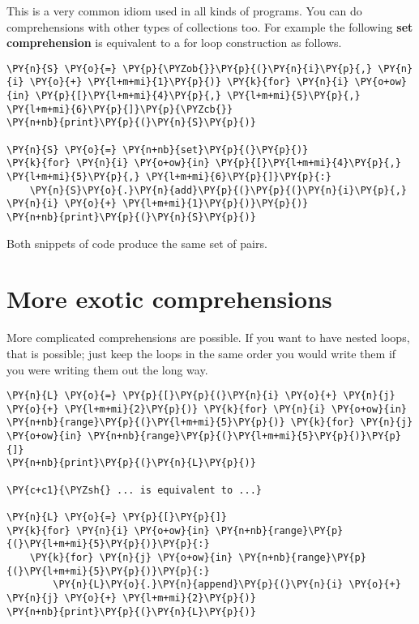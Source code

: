 This is a very common idiom used in all kinds of programs.  You can do comprehensions with other types of collections too.  For example the following \textbf{set comprehension} is equivalent to a for loop construction as follows.

\begin{Verbatim}[commandchars=\\\{\}]
\PY{n}{S} \PY{o}{=} \PY{p}{\PYZob{}}\PY{p}{(}\PY{n}{i}\PY{p}{,} \PY{n}{i} \PY{o}{+} \PY{l+m+mi}{1}\PY{p}{)} \PY{k}{for} \PY{n}{i} \PY{o+ow}{in} \PY{p}{[}\PY{l+m+mi}{4}\PY{p}{,} \PY{l+m+mi}{5}\PY{p}{,} \PY{l+m+mi}{6}\PY{p}{]}\PY{p}{\PYZcb{}}
\PY{n+nb}{print}\PY{p}{(}\PY{n}{S}\PY{p}{)}

\PY{n}{S} \PY{o}{=} \PY{n+nb}{set}\PY{p}{(}\PY{p}{)}
\PY{k}{for} \PY{n}{i} \PY{o+ow}{in} \PY{p}{[}\PY{l+m+mi}{4}\PY{p}{,} \PY{l+m+mi}{5}\PY{p}{,} \PY{l+m+mi}{6}\PY{p}{]}\PY{p}{:}
    \PY{n}{S}\PY{o}{.}\PY{n}{add}\PY{p}{(}\PY{p}{(}\PY{n}{i}\PY{p}{,} \PY{n}{i} \PY{o}{+} \PY{l+m+mi}{1}\PY{p}{)}\PY{p}{)}
\PY{n+nb}{print}\PY{p}{(}\PY{n}{S}\PY{p}{)}
\end{Verbatim}



Both snippets of code produce the same set of pairs.

\section{More exotic comprehensions}


More complicated comprehensions are possible.  If you want to have nested loops, that is possible; just keep the loops in the same order you would write them if you were writing them out the long way.

\begin{Verbatim}[commandchars=\\\{\}]
\PY{n}{L} \PY{o}{=} \PY{p}{[}\PY{p}{(}\PY{n}{i} \PY{o}{+} \PY{n}{j} \PY{o}{+} \PY{l+m+mi}{2}\PY{p}{)} \PY{k}{for} \PY{n}{i} \PY{o+ow}{in} \PY{n+nb}{range}\PY{p}{(}\PY{l+m+mi}{5}\PY{p}{)} \PY{k}{for} \PY{n}{j} \PY{o+ow}{in} \PY{n+nb}{range}\PY{p}{(}\PY{l+m+mi}{5}\PY{p}{)}\PY{p}{]}
\PY{n+nb}{print}\PY{p}{(}\PY{n}{L}\PY{p}{)}

\PY{c+c1}{\PYZsh{} ... is equivalent to ...}

\PY{n}{L} \PY{o}{=} \PY{p}{[}\PY{p}{]}
\PY{k}{for} \PY{n}{i} \PY{o+ow}{in} \PY{n+nb}{range}\PY{p}{(}\PY{l+m+mi}{5}\PY{p}{)}\PY{p}{:}
    \PY{k}{for} \PY{n}{j} \PY{o+ow}{in} \PY{n+nb}{range}\PY{p}{(}\PY{l+m+mi}{5}\PY{p}{)}\PY{p}{:}
        \PY{n}{L}\PY{o}{.}\PY{n}{append}\PY{p}{(}\PY{n}{i} \PY{o}{+} \PY{n}{j} \PY{o}{+} \PY{l+m+mi}{2}\PY{p}{)}
\PY{n+nb}{print}\PY{p}{(}\PY{n}{L}\PY{p}{)}
\end{Verbatim}


